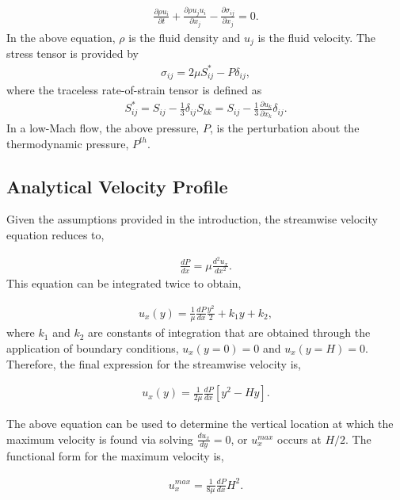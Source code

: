 \documentclass{article}
\begin{document}
\begin{align}
  \frac {\partial \rho u_i }{\partial t} + \frac{ \partial \rho u_j u_i}{\partial x_j} 
-\frac{\partial \sigma_{ij}}{\partial x_j} = 0.
\label{eq:momEq}
\end{align}
%
In the above equation, $\rho$ is the fluid density and $u_j$ is the fluid velocity. 
The stress tensor is provided by
\begin{align}
\sigma_{ij}  = 2 \mu S^*_{ij} - P \delta_{ij},
\end{align}
%
where the traceless rate-of-strain tensor is defined as
\begin{align}
S^*_{ij}  = S_{ij} - \frac{1}{3} \delta_{ij} S_{kk} \nonumber
		     = S_{ij} - \frac{1}{3} \frac{\partial  u_k }{\partial x_k}\delta_{ij}.
\end{align}
In a low-Mach flow, the above pressure, $P$, is the perturbation about the thermodynamic
pressure, $P^{th}$. 

\subsection{Analytical Velocity Profile}
Given the assumptions provided in the introduction, the streamwise velocity equation reduces to,

\begin{align}
  \frac{d P}{dx} = \mu \frac{d^2 u_x}{dx^2}.
\label{eq:simpEq}
\end{align}
This equation can be integrated twice to obtain,

\begin{align}
  u_x(y) = \frac{1}{\mu}\frac{d P}{dx} \frac{y^2}{2} + k_1 y + k_2,
\label{eq:simpEqWithK}
\end{align}
where $k_1$ and $k_2$ are constants of integration that are obtained through the 
application of boundary conditions, $u_x(y=0) = 0$ and  $u_x(y=H) = 0$. Therefore,
the final expression for the streamwise velocity is,

\begin{align}
  u_x(y) = \frac{1}{2 \mu}\frac{d P}{dx}\left[ y^2 - Hy \right].
\label{eq:simpleEqWithoutK}
\end{align}

The above equation can be used to determine the vertical location at which 
the maximum velocity is found via solving $\frac{du_x}{dy} = 0$, or $u^{max}_x$ 
occurs at $H/2$. The functional form for the maximum velocity is,

\begin{align}
  u^{max}_x = \frac{1}{8 \mu}\frac{d P}{dx}H^2.
\label{eq:uMax}
\end{align}
\end{document}
